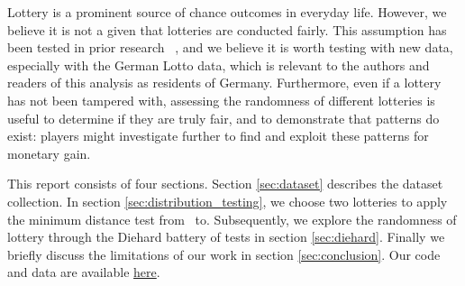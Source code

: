 Lottery is a prominent source of chance outcomes in everyday life. However, we believe it is not a given that lotteries are conducted fairly. This assumption has been tested in prior research ~\cite{Drakakis}, and we believe it is worth testing with new data, especially with the German Lotto data, which is relevant to the authors and readers of this analysis as residents of Germany. Furthermore, even if a lottery has not been tampered with, assessing the randomness of different lotteries is useful to determine if they are truly fair, and to demonstrate that patterns do exist: players might investigate further to find and exploit these patterns for monetary gain.

This report consists of four sections. Section \ref{sec:dataset} describes the dataset collection. In section \ref{sec:distribution_testing}, we choose two lotteries to apply the minimum distance test from~\cite{Drakakis} to. Subsequently, we explore the randomness of lottery through the Diehard battery of tests in section \ref{sec:diehard}. Finally we briefly discuss the limitations of our work in section \ref{sec:conclusion}. Our code and data are available \href{https://github.com/mihoracek/data_literacy_project}{here}.